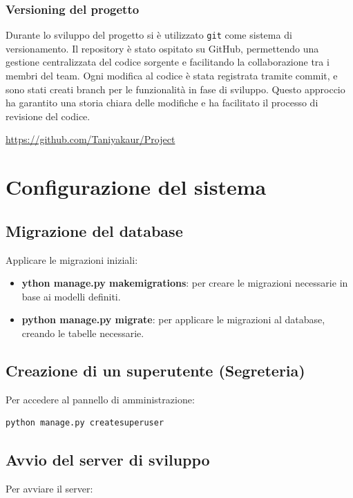 \documentclass[a4paper,12pt]{article}
\begin{document}
\subsubsection{Versioning del progetto}
Durante lo sviluppo del progetto si è utilizzato \texttt{git} come sistema di versionamento.
Il repository è stato ospitato su GitHub, permettendo una gestione centralizzata del codice sorgente e facilitando la collaborazione tra i membri del team. 
Ogni modifica al codice è stata registrata tramite commit, e sono stati creati branch per le funzionalità in fase di sviluppo. 
Questo approccio ha garantito una storia chiara delle modifiche e ha facilitato il processo di revisione del codice.

\url{https://github.com/Taniyakaur/Project}

\newpage

\section{Configurazione del sistema}

\subsection{Migrazione del database}
Applicare le migrazioni iniziali:

\begin{itemize}
    \item \textbf{ython manage.py makemigrations}: per creare le migrazioni necessarie in base ai modelli definiti.
    \item \textbf{python manage.py migrate}: per applicare le migrazioni al database, creando le tabelle necessarie.
    
\end{itemize}


\subsection*{Creazione di un superutente (Segreteria)}
Per accedere al pannello di amministrazione:

\begin{lstlisting}
python manage.py createsuperuser
\end{lstlisting}

\subsection{Avvio del server di sviluppo}
Per avviare il server:
\end{document}

